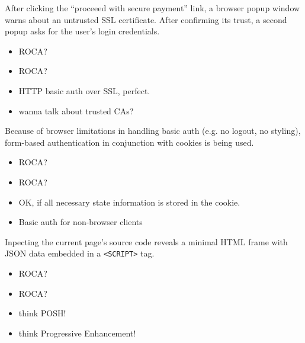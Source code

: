 \documentclass{beamer}
\newcommand{\rocaok}{\ding{51}}
\newcommand{\rocafail}{\ding{55}}
\begin{document}
\begin{frame}
  After clicking the ``proceeed with secure payment'' link, a browser popup window
  warns about an untrusted SSL certificate. After confirming its trust, a second
  popup asks for the user's login credentials.

  \vspace{0.3cm}
  \begin{itemize}
    \item<1|only@1>[\Large $\square$] \Large ROCA?
    \item<2|only@2>[\Large \rocaok] \Large ROCA?
    \item<2> HTTP basic auth over SSL, perfect.
    \item<2> wanna talk about trusted CAs?
  \end{itemize}

\end{frame}

\begin{frame}
  Because of browser limitations in handling basic auth (e.g. no logout, no styling),
  form-based authentication in conjunction with cookies is being used.

  \vspace{0.3cm}
  \begin{itemize}
    \item<1|only@1>[\Large $\square$] \Large ROCA?
    \item<2|only@2>[\Large \rocaok] \Large ROCA?
    \item<2> OK, if all necessary state information is stored in the cookie.
    \item<2> Basic auth for non-browser clients
  \end{itemize}

\end{frame}


\begin{frame}
  Inpecting the current page's source code reveals a minimal HTML frame with
  JSON data embedded in a \texttt{<SCRIPT>} tag.

  \vspace{0.3cm}
  \begin{itemize}
    \item<1|only@1>[\Large $\square$] \Large ROCA?
    \item<2|only@2>[\Large \rocafail] \Large ROCA?
    \item<2> think POSH!
    \item<2> think Progressive Enhancement!
  \end{itemize}

\end{frame}
\end{document}
